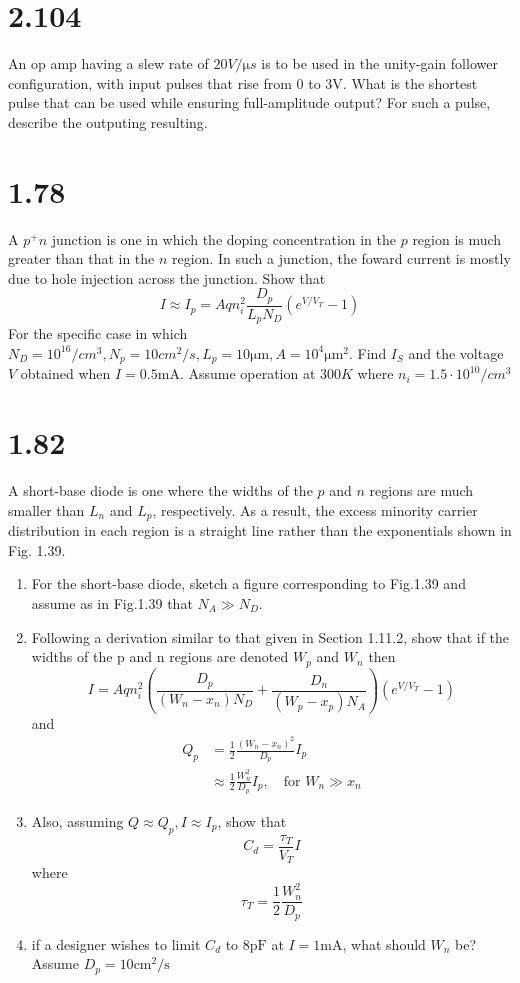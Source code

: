 \documentclass[12pt, a4paper]{article}
\newcommand{\smia}{\si{\milli\ampere}}
\newcommand{\svol}{\si{\volt}}
\begin{document}
\section{2.104}
An op amp having a slew rate of $20 \si{V/\micro s}$ is to be used in the unity-gain follower configuration, with input pulses that rise from $0$ to $3\svol$. What is the shortest pulse that can be used while ensuring full-amplitude output? For such a pulse, describe the outputing resulting.

\section{1.78}
A $p^+n$ junction is one in which the doping concentration in the $p$ region is much greater than that in the $n$ region. In such a junction, the foward current is mostly due to hole injection across the junction. Show that
\[
  I \approx I_p = Aqn_i^2\frac{D_p}{L_p N_D} \left( e^{V/V_T} - 1 \right)
\]
For the specific case in which $N_D = 10^{16} \si{/cm^3}, N_p = 10 \si{cm^2/s}, L_p = 10 \si{\micro\meter}, A = 10^4 \si{\micro \meter^2}$. Find $I_S$ and the voltage $V$ obtained when $I = 0.5\smia$. Assume operation at $300 \si{K}$ where $n_i = 1.5 \cdot 10^{10} \si{/cm^3}$

\section{1.82}
A short-base diode is one where the widths of the $p$ and $n$ regions are much smaller than $L_n$ and $L_p$, respectively. As a result, the excess minority carrier distribution in each region is a straight line rather than the exponentials shown in Fig. 1.39.
\begin{enumerate}[label=(\alph*)]
  \item For the short-base diode, sketch a figure corresponding to Fig.1.39 and assume as in Fig.1.39 that $N_A \gg N_D$.
  \item Following a derivation similar to that given in Section 1.11.2, show that if the widths of the p and n regions are denoted $W_p$ and $W_n$ then 
    \[
      I = Aqn_i^2 \left( \frac{D_p}{(W_n - x_n) N_D} + \frac{D_n}{(W_p - x_p) N_A} \right) \left( e^{V/V_T} - 1 \right) 
    \]
    and
    \begin{align*}
      Q_p &= \frac{1}{2} \frac{(W_n - x_n)^2}{D_p} I_p \\
          &\approx \frac{1}{2} \frac{W_n^2}{D_p}I_p, \quad \text{for } W_n \gg x_n
    \end{align*}
  \item Also, assuming $Q \approx Q_p, I \approx I_p$, show that
    \[ C_d = \frac{\tau_T}{V_T} I \]
    where
    \[ \tau_T = \frac{1}{2} \frac{W_n^2}{D_p} \]
  \item if a designer wishes to limit $C_d$ to $8 \si{\pico\farad}$ at $I = 1\smia$, what should $W_n$ be? Assume $D_p = 10 \si{\centi\meter^2/\second}$ 
\end{enumerate}
\end{document}
